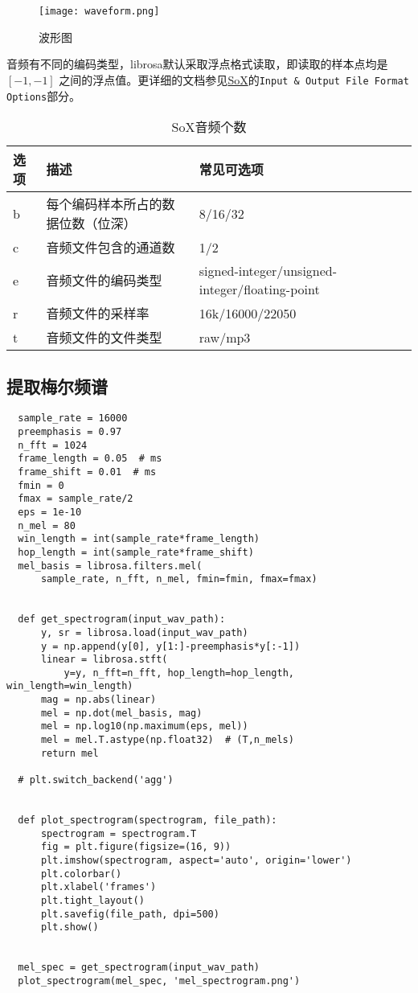 \documentclass[cn,10pt,math=newtx,citestyle=gb7714-2015,bibstyle=gb7714-2015]{elegantbook}
\begin{document}
\begin{figure}[htbp]
  \centering
  \texttt{[image: waveform.png]}
  \caption{波形图 \label{fig:waveform}}
\end{figure}


音频有不同的编码类型，librosa默认采取浮点格式读取，即读取的样本点均是 $[-1,-1]$ 之间的浮点值。更详细的文档参见\href{http://sox.sourceforge.net/sox.html}{SoX}的\lstinline{Input & Output File Format Options}部分。

\begin{table}[htbp]
  \centering
  \caption{SoX音频个数}
    \begin{tabular}{llll}
    \toprule
    选项 & 描述 & 常见可选项 \\
    \midrule
    b & 每个编码样本所占的数据位数（位深） & 8/16/32 \\
    c & 音频文件包含的通道数 & 1/2 \\
    e & 音频文件的编码类型 & signed-integer/unsigned-integer/floating-point \\
    r & 音频文件的采样率 & 16k/16000/22050 \\
    t & 音频文件的文件类型 & raw/mp3 \\
    \bottomrule
    \end{tabular}%
\end{table}%

\subsection{提取梅尔频谱}

\begin{lstlisting}
  sample_rate = 16000
  preemphasis = 0.97
  n_fft = 1024
  frame_length = 0.05  # ms
  frame_shift = 0.01  # ms
  fmin = 0
  fmax = sample_rate/2
  eps = 1e-10
  n_mel = 80
  win_length = int(sample_rate*frame_length)
  hop_length = int(sample_rate*frame_shift)
  mel_basis = librosa.filters.mel(
      sample_rate, n_fft, n_mel, fmin=fmin, fmax=fmax)
  
  
  def get_spectrogram(input_wav_path):
      y, sr = librosa.load(input_wav_path)
      y = np.append(y[0], y[1:]-preemphasis*y[:-1])
      linear = librosa.stft(
          y=y, n_fft=n_fft, hop_length=hop_length, win_length=win_length)
      mag = np.abs(linear)
      mel = np.dot(mel_basis, mag)
      mel = np.log10(np.maximum(eps, mel))
      mel = mel.T.astype(np.float32)  # (T,n_mels)
      return mel
  
  # plt.switch_backend('agg')
  
  
  def plot_spectrogram(spectrogram, file_path):
      spectrogram = spectrogram.T
      fig = plt.figure(figsize=(16, 9))
      plt.imshow(spectrogram, aspect='auto', origin='lower')
      plt.colorbar()
      plt.xlabel('frames')
      plt.tight_layout()
      plt.savefig(file_path, dpi=500)
      plt.show()
  
  
  mel_spec = get_spectrogram(input_wav_path)
  plot_spectrogram(mel_spec, 'mel_spectrogram.png')
\end{lstlisting}
\end{document}
